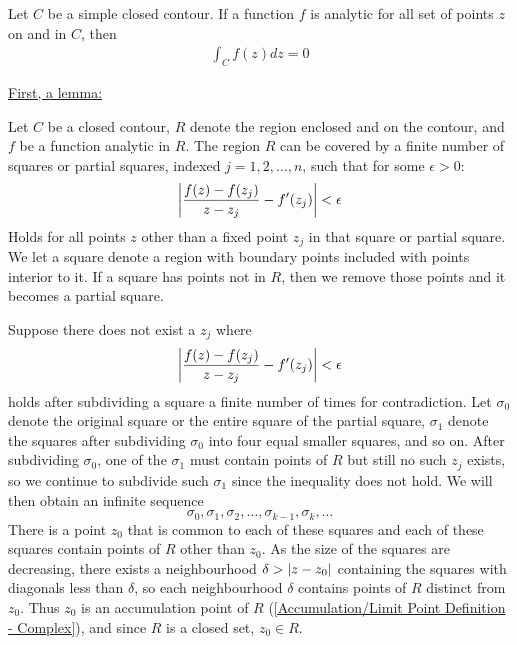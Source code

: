 \documentclass[12pt, english]{book}
\makeatletter
\renewenvironment{proof}[1][\proofname]{\par
	\pushQED{\qed}%
	\normalfont \topsep6\p@\@plus6\p@\relax
	\list{}{%
		\settowidth{\leftmargin}{\itshape\proofname:\hskip\labelsep}%
		\setlength{\labelwidth}{0pt}%
		\setlength{\itemindent}{-\leftmargin}%
		}%
	\item[\hskip\labelsep\itshape#1\@addpunct{:}]\ignorespaces
	}{\popQED\endlist\@endpefalse}
\makeatother
\begin{document}
	\begin{theorem}
		\label{Cauchy-Goursat Theorem - Complex}
		Let \(C\) be a simple closed contour. If a function \(f\) is analytic for all set of points \(z\) on and in \(C\), then 
		\begin{align*}
			\int_{C} f(z) dz = 0
		\end{align*}
	\end{theorem}
	\begin{proof}
		\underline{First, a lemma:} \newline
		\begin{lemma}
			Let \(C\) be a closed contour, \(R\) denote the region enclosed and on the contour, and \(f\) be a function analytic in \(R\). The region \(R\) can be covered by a finite number of squares or partial squares, indexed \(j = 1, 2, \ldots, n\), such that for some \(\epsilon > 0\): 
			\begin{align*}
				\abs{\frac{f(z) - f(z_j)}{z - z_j} - f'(z_j)} < \epsilon
			\end{align*}
			Holds for all points \(z\) other than a fixed point \(z_j\) in that square or partial square. We let a square denote a region with boundary points included with points interior to it. If a square has points not in \(R\), then we remove those points and it becomes a partial square.
		\end{lemma}
		\begin{proof}
			Suppose there does not exist a \(z_j\) where 
			\begin{align*}
				\abs{\frac{f(z) - f(z_j)}{z - z_j} - f'(z_j)} < \epsilon
			\end{align*}
			holds after subdividing a square a finite number of times for contradiction.
			Let \(\sigma_0\) denote the original square or the entire square of the partial square, \(\sigma_1\) denote the squares after subdividing \(\sigma_0\) into four equal smaller squares, and so on. After subdividing \(\sigma_0\), one of the \(\sigma_1\) must contain points of \(R\) but still no such \(z_j\) exists, so we continue to subdivide such \(\sigma_1\) since the inequality does not hold. We will then obtain an infinite sequence
			\[\sigma_0, \sigma_1, \sigma_2, \ldots, \sigma_{k-1}, \sigma_k, \ldots\]
			There is a point \(z_0\) that is common to each of these squares and each of these squares contain points of \(R\) other than \(z_0\). As the size of the squares are decreasing, there exists a neighbourhood \(\delta > \abs{z - z_0}\) containing the squares with diagonals less than \(\delta\), so each neighbourhood \(\delta\) contains points of \(R\) distinct from \(z_0\). Thus \(z_0\) is an accumulation point of \(R\) (\cref{Accumulation/Limit Point Definition - Complex}), and since \(R\) is a closed set, \(z_0 \in R\).
			

\end{proof}
\end{proof}
\end{document}
